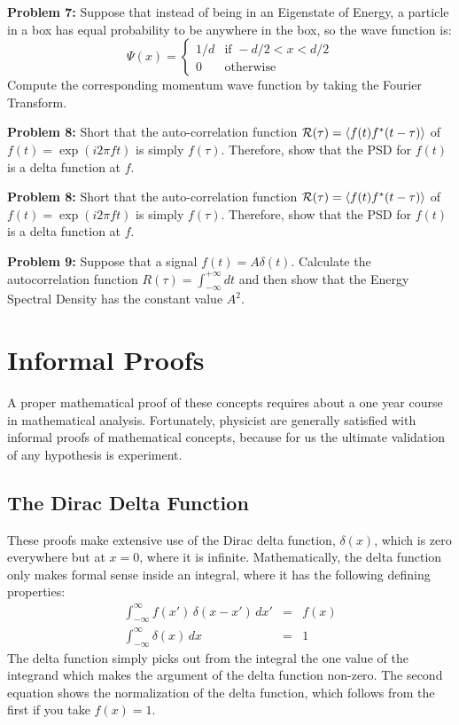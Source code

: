 \documentclass[12pt,oneside]{book}
\begin{document}
\noindent
{\bf Problem 7:}  Suppose that instead of being in an Eigenstate of Energy, a particle in a box has equal probability to be anywhere in the box, so the wave function is:
\begin{displaymath}
\Psi(x) = 
\left\{
	\begin{array}{ll}
		1/d  & \mbox{if } -d/2 < x < d/2 \\
		0 & \mbox{otherwise}
	\end{array}
\right.
\end{displaymath}
Compute the corresponding momentum wave function by taking the Fourier Transform.


\noindent
{\bf Problem 8:}  Short that the auto-correlation function $\mathcal{R}(\tau) = \braket{f(t)f^*(t-\tau)}$ of $f(t)=\exp(i2\pi f t)$ is simply $f(\tau)$.  Therefore, show that the PSD for $f(t)$ is a delta function at $f$.

\noindent
{\bf Problem 8:}  Short that the auto-correlation function $\mathcal{R}(\tau) = \braket{f(t)f^*(t-\tau)}$ of $f(t)=\exp(i2\pi f t)$ is simply $f(\tau)$.  Therefore, show that the PSD for $f(t)$ is a delta function at $f$.

\noindent
{\bf Problem 9:}  Suppose that a signal $f(t) = A \delta(t)$.  Calculate the autocorrelation function $R(\tau)=\int_{-\infty}^{+\infty} dt$ and then show that the Energy Spectral Density has the constant value $A^2$.

\appendix

\chapter{Informal Proofs}

A proper mathematical proof of these concepts requires about a one year course in mathematical analysis.  Fortunately, physicist are generally satisfied with informal proofs of mathematical concepts, because for us the ultimate validation of any hypothesis is experiment.

\section{The Dirac Delta Function}

These proofs make extensive use of the Dirac delta function, $\delta(x)$, which is zero everywhere but at $x=0$, where it is infinite.  Mathematically, the delta function only makes formal sense inside an integral, where it has the following defining properties:
\begin{eqnarray}
\int_{-\infty}^{\infty} f(x') \, \delta(x-x') \, dx' &=& f(x) \\
\int_{-\infty}^{\infty} \delta(x) \, dx &=& 1 \label{eqn:norm}
 \end{eqnarray}
The delta function simply picks out from the integral the one value of the integrand which makes the argument of the delta function non-zero.  The second equation shows the normalization of the delta function, which follows from the first if you take $f(x)=1$.
\end{document}
